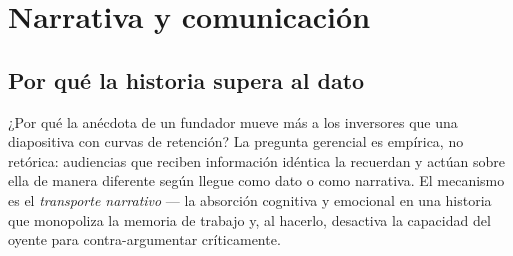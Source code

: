 \chapter{Narrativa y comunicación}\label{ch:storytelling-communication}


\section{Por qué la historia supera al dato}\label{sec:narrative-transportation}

¿Por qué la anécdota de un fundador mueve más a los inversores que una diapositiva con curvas
de retención? La pregunta gerencial es empírica, no retórica: audiencias que reciben información
idéntica la recuerdan y actúan sobre ella de manera diferente según llegue como dato o como
narrativa. El mecanismo es el \emph{transporte narrativo} — la absorción cognitiva y emocional
en una historia que monopoliza la memoria de trabajo y, al hacerlo, desactiva la capacidad del
oyente para contra-argumentar críticamente.

